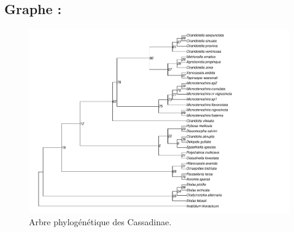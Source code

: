 \documentclass[a4paper, 12pt]{article}
\begin{document}
\subsection{Graphe :}

\begin{figure}[H]
    \centering
    \includegraphics[width=1\textwidth]{plot_Cassidinae_28S_D2_PhyML_GTR.pdf}
    \caption{\small Arbre phylogénétique des Cassadinae.}
    \label{Cassi_tree}
\end{figure}
\end{document}
